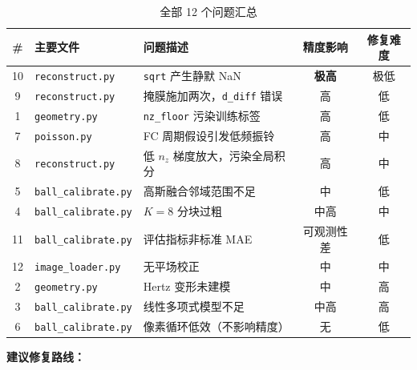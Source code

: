 \begin{table}[ht]
  \centering
  \caption{全部 12 个问题汇总}
  \label{tab:summary}
  \small
  \begin{tabularx}{\textwidth}{clXcc}
    \toprule
    \textbf{\#} & \textbf{主要文件}
                & \textbf{问题描述}
                & \textbf{精度影响}
                & \textbf{修复难度} \\
    \midrule
    10 & \texttt{reconstruct.py}     & \texttt{sqrt} 产生静默 NaN
       & \textbf{极高}   & 极低 \\
    9  & \texttt{reconstruct.py}     & 掩膜施加两次，\texttt{d\_diff} 错误
       & 高              & 低   \\
    1  & \texttt{geometry.py}        & \texttt{nz\_floor} 污染训练标签
       & 高              & 低   \\
    7  & \texttt{poisson.py}         & FC 周期假设引发低频振铃
       & 高              & 中   \\
    8  & \texttt{reconstruct.py}     & 低 $n_z$ 梯度放大，污染全局积分
       & 高              & 中   \\
    5  & \texttt{ball\_calibrate.py} & 高斯融合邻域范围不足
       & 中              & 低   \\
    4  & \texttt{ball\_calibrate.py} & $K=8$ 分块过粗
       & 中高            & 中   \\
    11 & \texttt{ball\_calibrate.py} & 评估指标非标准 MAE
       & 可观测性差      & 低   \\
    12 & \texttt{image\_loader.py}   & 无平场校正
       & 中              & 中   \\
    2  & \texttt{geometry.py}        & Hertz 变形未建模
       & 中              & 高   \\
    3  & \texttt{ball\_calibrate.py} & 线性多项式模型不足
       & 中高            & 高   \\
    6  & \texttt{ball\_calibrate.py} & 像素循环低效（不影响精度）
       & 无              & 低   \\
    \bottomrule
  \end{tabularx}
\end{table}

\noindent\textbf{建议修复路线：}

